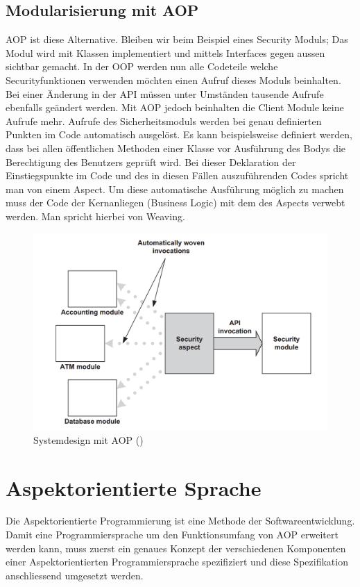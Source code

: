 \subsection{Modularisierung mit AOP}
\label{sec:aop_modaop}
AOP ist diese Alternative. Bleiben wir beim Beispiel eines Security Moduls; Das Modul wird mit Klassen implementiert und mittels Interfaces gegen aussen sichtbar gemacht. In der OOP werden nun alle Codeteile welche Securityfunktionen verwenden möchten einen Aufruf dieses Moduls beinhalten. Bei einer Änderung in der API müssen unter Umständen tausende Aufrufe ebenfalls geändert werden. Mit AOP jedoch beinhalten die Client Module keine Aufrufe mehr. Aufrufe des Sicherheitsmoduls werden bei genau definierten Punkten im Code automatisch ausgelöst. Es kann beispielsweise definiert werden, dass bei allen öffentlichen Methoden einer Klasse vor Ausführung des Bodys die Berechtigung des Benutzers geprüft wird. Bei dieser Deklaration der Einstiegspunkte im Code und des in diesen Fällen auszuführenden Codes spricht man von einem Aspect. Um diese automatische Ausführung möglich zu machen muss der Code der Kernanliegen (Business Logic) mit dem des Aspects verwebt werden. Man spricht hierbei von Weaving.
\begin{figure}[H]
	\centering
		\includegraphics[scale=0.5]{bilder/motivationAop}
	\caption{Systemdesign mit AOP (\cite[p~55]{laddad:aspectj})}
	\label{fig:motivationaop}
\end{figure}

\section{Aspektorientierte Sprache}
\label{sec:aop_lang}
Die Aspektorientierte Programmierung ist eine Methode der Softwareentwicklung. Damit eine Programmiersprache um den Funktionsumfang von AOP erweitert werden kann, muss zuerst ein genaues Konzept der verschiedenen Komponenten einer Aspektorientierten Programmiersprache spezifiziert und diese Spezifikation anschliessend umgesetzt werden.
